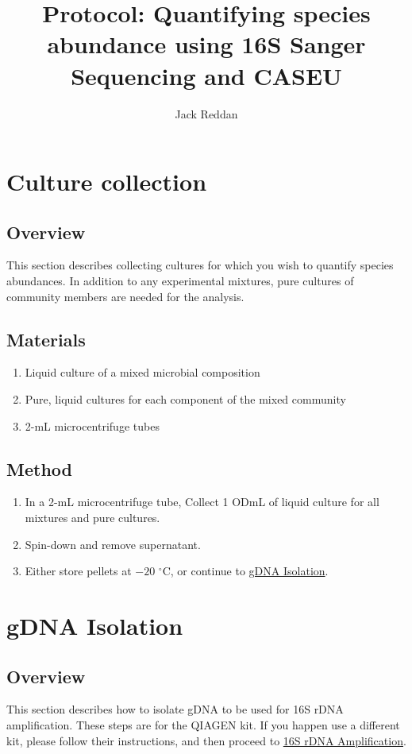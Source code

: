\documentclass{article}
\begin{document}
\title{Protocol: Quantifying species abundance using 16S Sanger Sequencing and CASEU}
\author{Jack Reddan}

\maketitle{}

\tableofcontents{}

\section{Culture collection}\label{CC}
\subsection{Overview}
This section describes collecting cultures for which you wish to quantify species abundances.
In addition to any experimental mixtures,
pure cultures of community members are needed for the analysis.

\subsection{Materials}
\begin{enumerate}
  \item Liquid culture of a mixed microbial composition
  \item Pure, liquid cultures for each component of the mixed community
  \item 2-mL microcentrifuge tubes
\end{enumerate}

\subsection{Method}
\begin{enumerate}
  \item In a 2-mL microcentrifuge tube, Collect 1 ODmL of liquid culture for all mixtures and pure cultures.
  \item Spin-down and remove supernatant.
  \item Either store pellets at $-20$ $^\circ$C, or continue to \hyperref[GI]{gDNA Isolation}.
\end{enumerate}

\section{gDNA Isolation}\label{GI}
\subsection{Overview}
This section describes how to isolate gDNA to be used for 16S rDNA amplification.
These steps are for the QIAGEN kit.
If you happen use a different kit,
please follow their instructions, and then proceed to \hyperref[1rA]{16S rDNA Amplification}.
\end{document}
